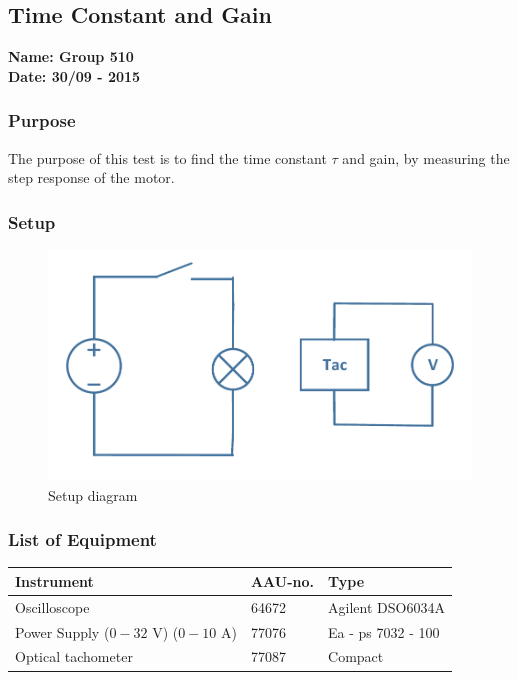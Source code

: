 \pagebreak
\subsection{Time Constant and Gain} %
\textbf{Name: Group 510}\\
\textbf{Date: 30/09 - 2015}

\subsubsection{Purpose}
The purpose of this test is to find the time constant $\tau$ and gain, by measuring the step response of the motor.

\subsubsection{Setup}
\begin{figure}[H]
  \centering
	\includegraphics[scale=0.5]{figures/MotorTest8.pdf}
	\caption{Setup diagram}
\end{figure}

\subsubsection{List of Equipment}

\begin{table}[H]
\begin{tabular}{|l|l|p{4cm}|}
\hline%
  \textbf{Instrument}                        &  \textbf{AAU-no.}  &  \textbf{Type}       \\
\hline%
  Oscilloscope                               &  64672             &  Agilent DSO6034A    \\
\hline%
  Power Supply ($0 - 32$ V) ($0 - 10$ A)     &  77076             &  Ea - ps 7032 - 100  \\
\hline%
  Optical tachometer                         &  77087             &  Compact             \\
\hline%
\end{tabular}
\end{table}

